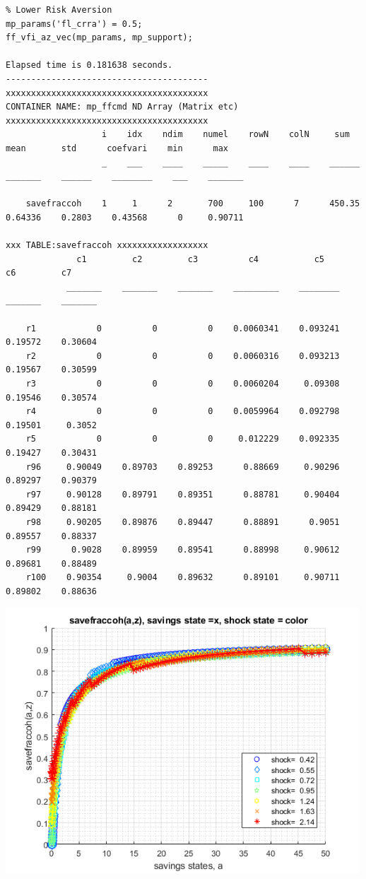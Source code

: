 \documentclass[
]{book}
\begin{document}
\begin{verbatim}
% Lower Risk Aversion
mp_params('fl_crra') = 0.5;
ff_vfi_az_vec(mp_params, mp_support);

Elapsed time is 0.181638 seconds.
----------------------------------------
xxxxxxxxxxxxxxxxxxxxxxxxxxxxxxxxxxxxxxxx
CONTAINER NAME: mp_ffcmd ND Array (Matrix etc)
xxxxxxxxxxxxxxxxxxxxxxxxxxxxxxxxxxxxxxxx
                   i    idx    ndim    numel    rowN    colN     sum       mean       std      coefvari    min      max  
                   _    ___    ____    _____    ____    ____    ______    _______    ______    ________    ___    _______

    savefraccoh    1     1      2       700     100      7      450.35    0.64336    0.2803    0.43568      0     0.90711

xxx TABLE:savefraccoh xxxxxxxxxxxxxxxxxx
              c1         c2         c3          c4           c5         c6         c7   
            _______    _______    _______    _________    ________    _______    _______

    r1            0          0          0    0.0060341    0.093241    0.19572    0.30604
    r2            0          0          0    0.0060316    0.093213    0.19567    0.30599
    r3            0          0          0    0.0060204     0.09308    0.19546    0.30574
    r4            0          0          0    0.0059964    0.092798    0.19501     0.3052
    r5            0          0          0     0.012229    0.092335    0.19427    0.30431
    r96     0.90049    0.89703    0.89253      0.88669     0.90296    0.89297    0.90379
    r97     0.90128    0.89791    0.89351      0.88781     0.90404    0.89429    0.88181
    r98     0.90205    0.89876    0.89447      0.88891      0.9051    0.89557    0.88337
    r99      0.9028    0.89959    0.89541      0.88998     0.90612    0.89681    0.88489
    r100    0.90354     0.9004    0.89632      0.89101     0.90711    0.89802    0.88636
\end{verbatim}

\includegraphics[width=5.20833in,height=\textheight]{img/fx_vfi_az_vec_images/figure_2.png}
\end{document}
